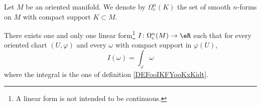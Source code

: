 Let \( M\) be an oriented manifold. We denote by \( \Omega^n_c(K)\) the set of smooth \( n\)-forms on \( M\) with compact support \( K\subset M\).

\begin{proposition}	\label{PROPooOSOCooUkalzR}
	There exists one and only one linear form\footnote{A linear form is not intended to be continuous.} \(I \colon \Omega_c^n(M)\to \eR  \) such that for every oriented chart \( (U,\varphi)\) and every \( \omega\) with compact support in \( \varphi(U)\),
	\begin{equation}
		I(\omega)=\int_{\varphi}\omega
	\end{equation}
	where the integral is the one of definition \ref{DEFooIKFYooKxKidt}.
\end{proposition}

